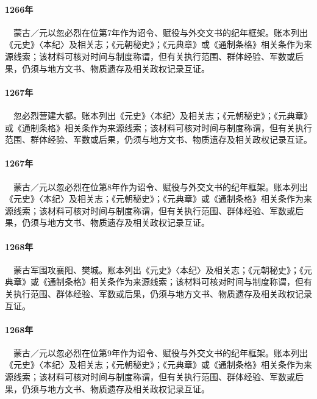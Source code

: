 \paragraph{1266年}　蒙古／元以忽必烈在位第7年作为诏令、赋役与外交文书的纪年框架。账本列出《元史》〈本纪〉及相关志；《元朝秘史》；《元典章》或《通制条格》相关条作为来源线索；该材料可核对时间与制度称谓，但有关执行范围、群体经验、军数或后果，仍须与地方文书、物质遗存及相关政权记录互证。

\paragraph{1267年}　忽必烈营建大都。账本列出《元史》〈本纪〉及相关志；《元朝秘史》；《元典章》或《通制条格》相关条作为来源线索；该材料可核对时间与制度称谓，但有关执行范围、群体经验、军数或后果，仍须与地方文书、物质遗存及相关政权记录互证。

\paragraph{1267年}　蒙古／元以忽必烈在位第8年作为诏令、赋役与外交文书的纪年框架。账本列出《元史》〈本纪〉及相关志；《元朝秘史》；《元典章》或《通制条格》相关条作为来源线索；该材料可核对时间与制度称谓，但有关执行范围、群体经验、军数或后果，仍须与地方文书、物质遗存及相关政权记录互证。

\paragraph{1268年}　蒙古军围攻襄阳、樊城。账本列出《元史》〈本纪〉及相关志；《元朝秘史》；《元典章》或《通制条格》相关条作为来源线索；该材料可核对时间与制度称谓，但有关执行范围、群体经验、军数或后果，仍须与地方文书、物质遗存及相关政权记录互证。

\paragraph{1268年}　蒙古／元以忽必烈在位第9年作为诏令、赋役与外交文书的纪年框架。账本列出《元史》〈本纪〉及相关志；《元朝秘史》；《元典章》或《通制条格》相关条作为来源线索；该材料可核对时间与制度称谓，但有关执行范围、群体经验、军数或后果，仍须与地方文书、物质遗存及相关政权记录互证。

